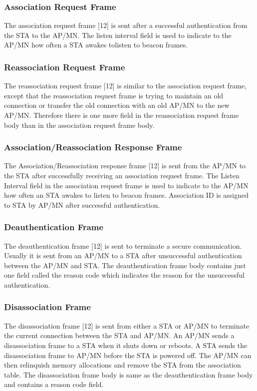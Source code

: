 \documentclass[12pt,a4paper]{report}
\begin{document}
\subsubsection{Association Request Frame }
The association request frame [12] is sent after a successful authentication from the STA to the AP/MN. The listen interval field is used to indicate to the AP/MN how often a STA awakes tolisten to beacon frames. 
\subsubsection{Reassociation Request Frame }
The reassociation request frame [12] is similar to the association request frame, except that the reassociation request frame is trying to maintain an old connection or transfer the old connection with an old AP/MN to the new AP/MN. Therefore there is one more field in the reassociation request frame body than in the association request frame body. 
\subsubsection{Association/Reassociation Response Frame }
The Association/Reassociation response frame [12] is sent from the AP/MN to the STA after successfully receiving an association request frame. The Listen Interval field in the association request frame is used to indicate to the AP/MN how often an STA awakes to listen to beacon frames. Association ID is assigned to STA by AP/MN after successful authentication. 
\subsubsection{Deauthentication Frame }
The deauthentication frame [12] is sent to terminate a secure communication. Usually it is sent from an AP/MN to a STA after unsuccessful authentication between the AP/MN and STA. The deauthentication frame body contains just one field called the reason code which indicates the reason for the unsuccessful authentication. 
\subsubsection{Disassociation Frame }
The disassociation frame [12] is sent from either a STA or AP/MN to terminate the current connection between the STA and AP/MN. An AP/MN sends a disassociation frame to a STA when it shuts down or reboots. A STA sends the disassociation frame to AP/MN before the STA is powered off. The AP/MN can then relinquish memory allocations and remove the STA from the association table. The disassociation frame body is same as the deauthentication frame body and contains a reason code field.
\end{document}
